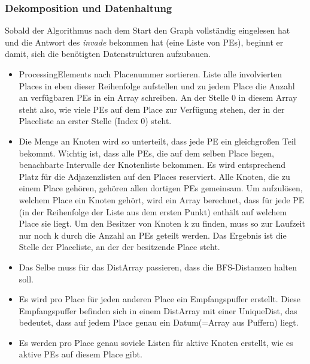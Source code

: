 \subsubsection{Dekomposition und Datenhaltung} %
\label{ssub:dekomposition_und_datenhaltung}

Sobald der Algorithmus nach dem Start den Graph vollständig eingelesen hat und die Antwort des \textit{invade} bekommen hat (eine Liste von PEs), beginnt er damit, sich die benötigten Datenstrukturen aufzubauen.
\begin{itemize}
	\item ProcessingElements nach Placenummer sortieren. Liste alle involvierten Places in eben dieser Reihenfolge aufstellen und zu jedem Place die Anzahl an verfügbaren PEs in ein Array schreiben. An der Stelle 0 in diesem Array steht also, wie viele PEs auf dem Place zur Verfügung stehen, der in der Placeliste an erster Stelle (Index 0) steht.
	\item Die Menge an Knoten wird so unterteilt, dass jede PE ein gleichgroßen Teil bekommt. Wichtig ist, dass alle PEs, die auf dem selben Place liegen, benachbarte Intervalle der Knotenliste bekommen. Es wird entsprechend Platz für die Adjazenzlisten auf den Places reserviert. Alle Knoten, die zu einem Place gehören, gehören allen dortigen PEs gemeinsam. Um aufzulösen, welchem Place ein Knoten gehört, wird ein Array berechnet, dass für jede PE (in der Reihenfolge der Liste aus dem ersten Punkt) enthält auf welchem Place sie liegt. Um den Besitzer von Knoten k zu finden, muss so zur Laufzeit nur noch k durch die Anzahl an PEs geteilt werden. Das Ergebnis ist die Stelle der Placeliste, an der der besitzende Place steht.
	\item Das Selbe muss für das DistArray passieren, dass die BFS-Distanzen halten soll.
	\item Es wird pro Place für jeden anderen Place ein Empfangspuffer erstellt. Diese Empfangspuffer befinden sich in einem DistArray mit einer UniqueDist, das bedeutet, dass auf jedem Place genau ein Datum(=Array aus Puffern) liegt.
	\item Es werden pro Place genau soviele Listen für aktive Knoten erstellt, wie es aktive PEs auf diesem Place gibt.
\end{itemize}


